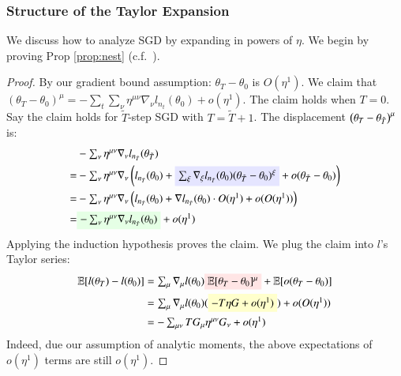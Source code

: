 
    \subsubsection{Structure of the Taylor Expansion} %
    We discuss how to analyze SGD by expanding in powers of $\eta$.  We begin
    by proving Prop \ref{prop:nest} (c.f.\ \cite{ne04,ro18}). 

    \begin{proof} %
        By our gradient bound assumption: $\theta_T - \theta_0$ is $O(\eta^1)$.
        We {claim} that $(\theta_T - \theta_0)^\mu =
        -\sum_t \sum_\nu \eta^{\mu\nu} \nabla_\nu l_{n_t}(\theta_0) + o(\eta^1)$.
        The claim holds when $T=0$.  Say the claim holds for
        ${\tilde T}$-step SGD with
        $T = {\tilde T}+1$.  The displacement
        $\left(\theta_{T} - \theta_{{\tilde T}}\right)^\mu$
        is:%
        \begin{align*}
               & - \textstyle\sum_{\nu} \eta^{\mu\nu} \nabla_\nu l_{n_{\tilde T}}(\theta_{{\tilde T}})   
            \\=& - \textstyle\sum_{\nu} \eta^{\mu\nu} \nabla_\nu \wrap{
                       l_{n_{\tilde T}}(\theta_0)
                       + \text{\translucent{moosky}{$\sum_{\xi} \nabla_\xi l_{n_{\tilde T}}(\theta_0) (\theta_{{\tilde T}} - \theta_0)^\xi$}}
                       + o(\theta_{{\tilde T}} - \theta_0)
                   }    
            \\=& - \textstyle\sum_{\nu} \eta^{\mu\nu} \nabla_\nu \wrap{
                          l_{n_{\tilde T}}(\theta_0)
                          + \nabla l_{n_{\tilde T}}(\theta_0) \cdot O(\eta^1) + o(O(\eta^1))
                      }    
            \\=& \textstyle\text{\translucent{moolime}{$- \sum_\nu \eta^{\mu\nu} \nabla_\nu l_{n_{\tilde T}}(\theta_0)$}} + o(\eta^1)
        \end{align*}
        Applying the induction hypothesis proves the claim.
        We plug the claim into $l$'s Taylor series:
        \begin{align*}
            \expc[l(\theta_T) - l(\theta_0)]
            &= \textstyle \sum_\mu \nabla_\mu l(\theta_0) \text{\translucent{moopink}{$\expc[\theta_T - \theta_0]^\mu$}} + \expc[o(\theta_T - \theta_0)] \\
            &= \textstyle \sum_\mu \nabla_\mu l(\theta_0) (\text{\translucent{moogold}{$-T\eta G + o(\eta^1)$}}) + o(O(\eta^1)) \\
            &= \textstyle - \sum_{\mu\nu} T G_\mu \eta^{\mu\nu} G_\nu + o(\eta^1)
        \end{align*}
        Indeed, due our assumption of analytic moments, the above
        expectations of $o(\eta^1)$ terms are still $o(\eta^1)$.
    \end{proof}

